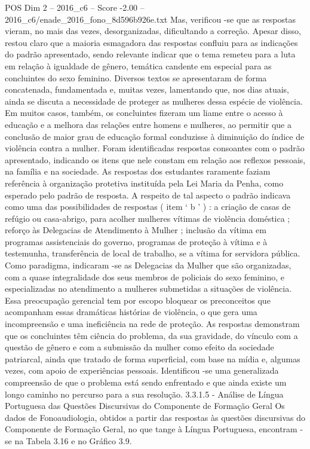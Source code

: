 \begin{textsample}{POS Dim 2 – 2016\_c6 – Score -2.00 – 2016\_c6/enade\_2016\_fono\_8d596b926e.txt}
Mas, verificou -se que as respostas vieram, no mais das vezes, desorganizadas, dificultando a correção.
Apesar disso, restou claro que a maioria esmagadora das respostas confluiu para as indicações do padrão apresentado, sendo relevante indicar que o tema remeteu para a luta em relação à igualdade de gênero, temática candente em especial para as concluintes do sexo feminino.
Diversos textos se apresentaram de forma concatenada, fundamentada e, muitas vezes, lamentando que, nos dias atuais, ainda se discuta a necessidade de proteger as mulheres dessa espécie de violência.
Em muitos casos, também, os concluintes fizeram um liame entre o acesso à educação e a melhora das relações entre homens e mulheres, ao permitir que a conclusão de maior grau de educação formal conduzisse à diminuição do índice de violência contra a mulher.
Foram identificadas respostas consoantes com o padrão apresentado, indicando os itens que nele constam em relação aos reflexos pessoais, na família e na sociedade.
As respostas dos estudantes raramente faziam referência à organização protetiva instituída pela Lei Maria da Penha, como esperado pelo padrão de resposta.
A respeito de tal aspecto o padrão indicava como uma das possibilidades de respostas ( item ‘ b ’ ) : a criação de casas de refúgio ou casa-abrigo, para acolher mulheres vítimas de violência doméstica ; reforço às Delegacias de Atendimento à Mulher ; inclusão da vítima em programas assistenciais do governo, programas de proteção à vítima e à testemunha, transferência de local de trabalho, se a vítima for servidora pública.
Como paradigma, indicaram -se as Delegacias da Mulher que são organizadas, com a quase integralidade dos seus membros de policiais do sexo feminino, e especializadas no atendimento a mulheres submetidas a situações de violência.
Essa preocupação gerencial tem por escopo bloquear os preconceitos que acompanham essas dramáticas histórias de violência, o que gera uma incompreensão e uma ineficiência na rede de proteção.
As respostas demonstram que os concluintes têm ciência do problema, da sua gravidade, do vínculo com a questão de gênero e com a submissão da mulher como efeito da sociedade patriarcal, ainda que tratado de forma superficial, com base na mídia e, algumas vezes, com apoio de experiências pessoais.
Identificou -se uma generalizada compreensão de que o problema está sendo enfrentado e que ainda existe um longo caminho no percurso para a sua resolução. 3.3.1.5 - Análise de Língua Portuguesa das Questões Discursivas do Componente de Formação Geral Os dados de Fonoaudiologia, obtidos a partir das respostas às questões discursivas do Componente de Formação Geral, no que tange à Língua Portuguesa, encontram -se na Tabela 3.16 e no Gráfico 3.9.

\end{textsample}

